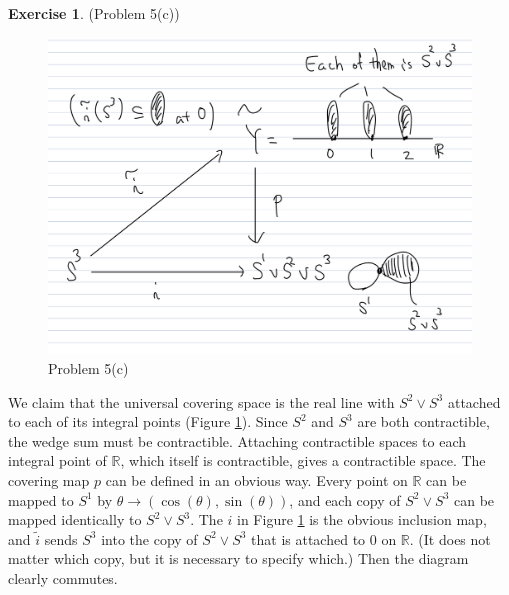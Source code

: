 \documentclass[12pt, psamsfonts]{amsart}
\theoremstyle{definition}
\newtheorem*{exer}{Exercise}
\theoremstyle{remark}
\numberwithin{equation}{section}
\begin{document}
\begin{exer}{(Problem 5(c))}
  \begin{figure}
    \includegraphics[width=.8\linewidth]{problem5_c.jpeg}
    \caption{Problem 5(c)}
    \label{fig:5c}
  \end{figure}
  We claim that the universal covering space is the real line with $S^2 \vee S^3$ attached to each of its integral points (Figure \ref{fig:5c}).
  Since $S^2$ and $S^3$ are both contractible, the wedge sum must be contractible.
  Attaching contractible spaces to each integral point of $\mathbb{R}$, which itself is contractible, gives a contractible space.
  The covering map $p$ can be defined in an obvious way.
  Every point on $\mathbb{R}$ can be mapped to $S^1$ by $\theta \rightarrow (\cos(\theta), \sin(\theta))$, and each copy of $S^2 \vee S^3$ can be mapped identically to $S^2 \vee S^3$.
  The $i$ in Figure \ref{fig:5c} is the obvious inclusion map, and $\tilde{i}$ sends $S^3$ into the copy of $S^2 \vee S^3$ that is attached to 0 on $\mathbb{R}$.
  (It does not matter which copy, but it is necessary to specify which.)
  Then the diagram clearly commutes.


\end{exer}
\end{document}
